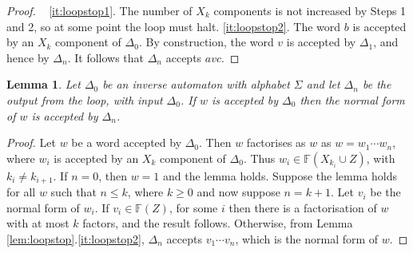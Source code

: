 \documentclass[a4paper,12pt]{article}
\renewcommand{\a}{\alpha }
\renewcommand{\b}{\beta }
\newcommand{\g}{\gamma }
\newcommand{\D}{\Delta }
\renewcommand{\d}{\delta }
\renewcommand{\L}{\Lambda }
\renewcommand{\S}{\Sigma }
\newtheorem{lemma}[theorem]{Lemma}
\numberwithin{equation}{section}
\numberwithin{figure}{section}
\newcommand{\FF}{\ensuremath{\mathbb{F}}}
\begin{document}
\begin{proof}
~ 
\ref{it:loopstop1}. The number of $X_k$ components is not
increased by Steps 1 and 2, so at some point the loop must halt.
\noindent \ref{it:loopstop2}. The word $b$ is accepted by an $X_k$
component of $\D_0$. By construction, the word $v$ is accepted by
$\D_1$, and hence by $\D_n$. It follows that $\D_n$ accepts $avc$.
\end{proof}
\begin{lemma}\label{lem:nfacc}
Let $\D_0$ be an inverse automaton with alphabet $\S$ and let
$\D_n$ be the output from the loop, with input $\D_0$. If $w$ is
accepted by $\D_0$ then the normal form of $w$ is accepted by $\D_n$.
\end{lemma}
\begin{proof}
Let $w$ be a word accepted by $\D_0$. Then $w$ factorises as  $w$
as $w=w_1\cdots w_n$, where $w_i$ is accepted by an $X_k$
component of $\D_0$. Thus $w_i\in \FF(X_{k_i}\cup Z)$, with $k_i\neq
k_{i+1}$. If $n=0$, then $w=1$ and the lemma holds. Suppose the
lemma holds for all $w$ such that $n\le k$, where $k\ge 0$ and now
suppose $n=k+1$. Let $v_i$ be the normal form of $w_i$. If $v_i\in
\FF(Z)$, for some $i$ then there is a factorisation of $w$ with at
most $k$ factors, and the result follows. Otherwise, from Lemma
\ref{lem:loopstop}.\ref{it:loopstop2},  $\D_n$ accepts $v_1\cdots
v_n$, which is the normal form of $w$.

\end{proof}
\end{document}
